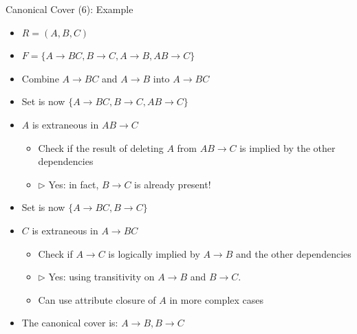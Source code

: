 \documentclass[aspectratio=169, xcolor=dvipsnames]{beamer}
\begin{document}
\begin{frame}{Canonical Cover (6): Example}
    \begin{itemize}[<+->]
        \item $R = (A, B, C)$
        \item $F = \{A \rightarrow BC, B \rightarrow C, A \rightarrow B, AB \rightarrow C\}$
        \item Combine $A \rightarrow BC$ and $A \rightarrow B$ into $A \rightarrow BC$
        \item Set is now $\{A \rightarrow BC, B \rightarrow C, AB \rightarrow C\}$
        \item $A$ is extraneous in $AB \rightarrow C$
        \begin{itemize}
            \item[$\triangleright$] Check if the result of deleting $A$ from $AB \rightarrow C$ is implied by the other dependencies
            \item[$\triangleright$] $\triangleright$ Yes: in fact, $B \rightarrow C$ is already present!
        \end{itemize}
        \item Set is now $\{A \rightarrow BC, B \rightarrow C\}$
        \item $C$ is extraneous in $A \rightarrow BC$
        \begin{itemize}
            \item[$\triangleright$] Check if $A \rightarrow C$ is logically implied by $A \rightarrow B$ and the other dependencies
            \item[$\triangleright$] $\triangleright$ Yes: using transitivity on $A \rightarrow B$ and $B \rightarrow C$.
            \item[$\triangleright$] Can use attribute closure of $A$ in more complex cases
        \end{itemize}
        \item The canonical cover is: $A \rightarrow B, B \rightarrow C$
    \end{itemize}
\end{frame}
\end{document}
